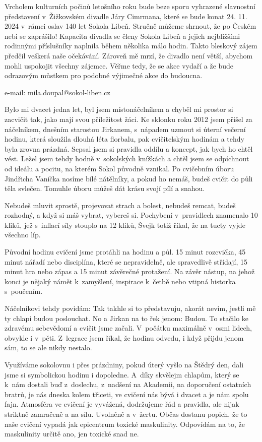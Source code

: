 \documentclass[11pt]{article}
\begin{document}
Vrcholem kulturních počinů letošního roku bude beze sporu vyhrazené slavnostní představení v~Žižkovském divadle Járy Cimrmana, které se bude konat 24. 11. 2024 v~rámci oslav 140 let Sokola Libeň. Stručně můžeme shrnout, že po \luv{}Českém nebi\ruv{} se zaprášilo! Kapacita divadla se členy Sokola Libeň a jejich nejbližšími rodinnými příslušníky naplnila během několika málo hodin. Takto bleskový zájem předčil veškerá naše očekávání. Zároveň mě mrzí, že divadlo není větší, abychom mohli uspokojit všechny zájemce. Věřme tedy, že se akce vydaří a že bude odrazovým můstkem pro podobné výjimečné akce do budoucna.


\signature{Miloslav Doupal}{e-mail: mila.doupal@sokol-liben.cz}

Bylo mi dvacet jedna let, byl jsem místonáčelníkem a chyběl mi prostor si zacvičit tak, jako mají svou příležitost žáci. Ke sklonku roku 2012 jsem přišel za náčelníkem, dnešním starostou Jirkanem, s~nápadem uzmout si úterní večerní hodinu, která sloužila dlouhá léta florbalu, pak cvičitelským hodinám a tehdy byla zrovna prázdná. Sepsal jsem si pravidla oddílu a koncept, jak bych ho chtěl vést. Ležel jsem tehdy hodně v~sokolských knížkách a chtěl jsem se odpíchnout od ideálu a pocitu, na kterém Sokol původně vznikal. Po cvičebním úboru Jindřicha Vaníčka nosíme bílé nátělníky, a pokud ho nemáš, budeš cvičit do půli těla svlečen. Tomuhle úboru můžeš dát krásu svojí pílí a snahou.

Nebudeš mluvit sprostě, projevovat strach a bolest, nebudeš remcat, budeš rozhodný, a když si máš vybrat, vybereš si. Pochybení v~pravidlech znamenalo 10 kliků, jež s~inflací síly stouplo na 12 kliků, Švejk totiž říkal, že na tucty vyjde všechno líp.

Původní hodinu cvičení jsme protáhli na hodinu a půl. 15 minut rozcvička, 45 minut nářadí nebo disciplína, které se nepravidelně, ale spravedlivě střídají, 15 minut hra nebo zápas a 15 minut závěrečné protažení. Na závěr nástup, na jehož konci je nějaký námět k~zamyšlení, inspirace k~četbě nebo vtipná historka s~poučením.

Náčelníkovi tehdy povidám: \luv{}Tak takhle si to představuju, akorát nevim, jestli mě ty chlapi budou poslouchat.\ruv{} No a Jirkan na to řek jenom: \luv{}Budou.\ruv{} To stačilo ke zdravému sebevědomí a cvičit jsme začali. V~počátku maximálně v~osmi lidech, obvykle i v~pěti. Z~legrace jsem říkal, že hodinu odvedu, i když přijdu jenom sám, to se ale nikdy nestalo.

Využíváme sokolovnu i přes prázdniny, pokud úterý vyšlo na Štědrý den, dali jsme si symbolickou hodinu i dopoledne. A~díky skvělejm chlapům, který se k~nám dostali buď z~doslechu, z~nadšení na Akademii, na doporučení ostatních bratrů, je nás dneska kolem třiceti, ve cvičení nás bývá i dvacet a je nám spolu fajn. Atmosféra ve cvičení je vyvážená, dodržujeme řád a pravidla, ale nijak striktně zamračeně a na sílu. Uvolněně a v~žertu. Občas dostanu popich, že to naše cvičení vypadá jak epicentrum toxické maskulinity. Odpovídám na to, že maskulinity určitě ano, jen toxické snad ne.
\end{document}
